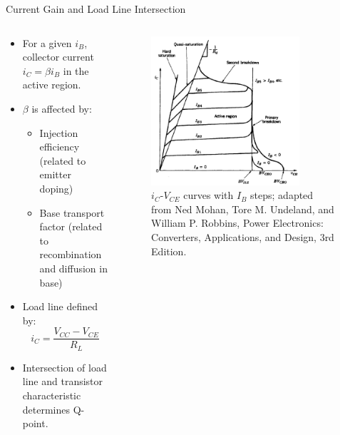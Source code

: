 \begin{frame}{Current Gain and Load Line Intersection}
    \begin{columns}
    \begin{column}{0.6\textwidth}
    \begin{itemize}
        \item For a given $i_B$, collector current $i_C = \beta i_B$ in the active region.
        \item $\beta$ is affected by:
        \begin{itemize}
            \item Injection efficiency (related to emitter doping)
            \item Base transport factor (related to recombination and diffusion in base)
        \end{itemize}
        \item Load line defined by:
        \[
            i_C = \frac{V_{CC} - V_{CE}}{R_L}
        \]
        \item Intersection of load line and transistor characteristic determines Q-point.
    \end{itemize}
    \end{column}

    \begin{column}{0.4\textwidth}
    \begin{figure}
        \centering
        \includegraphics[width=0.8\textwidth]{fig/lec04/BJT_VI_Characteristics2.png}
        \caption{$i_C$-$V_{CE}$ curves with $I_B$ steps; adapted from Ned Mohan, Tore M. Undeland, and William P. Robbins, Power Electronics: Converters, Applications, and Design, 3rd Edition.}
    \end{figure}
    \end{column}
\end{columns}
\end{frame}



